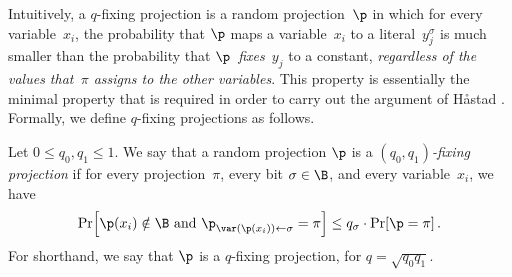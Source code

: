 \documentclass{toc}
\begin{document}
Intuitively, a $q$-fixing projection is a random projection~$\p$
in which for every variable~$x_{i}$, the probability that $\p$
maps a variable~$x_{i}$ to a literal~$y_{j}^{\sigma}$ is much
smaller than the probability that $\p$~\emph{fixes~}$y_{j}$ to
a constant, \emph{regardless of the values that~$\pi$ assigns to
the other variables}. This property is essentially the minimal property
that is required in order to carry out the argument of H{\aa}stad
\cite{H98}. Formally, we define $q$-fixing projections as follows. 
\begin{definition}
\label{def:fixing-projections}Let $0\le q_{0},q_{1}\le1$. We say that
a random projection $\p$ is a \emph{$(q_{0},q_{1})$-fixing projection}
if for every projection~$\pi$, every bit $\sigma\in\B$, and every
variable~$x_{i}$, we have 
\begin{equation}
\Pr\!\left[\p(x_{i})\notin\B\text{ and }\p_{\var(\p(x_{i}))\gets\sigma}=\pi\right]\le q_{\sigma}\cdot\Pr\!\left[\p=\pi\right].\label{eq:fixing-projection}
\end{equation}
For shorthand, we say that $\p$ is a $q$-fixing projection, for
$q=\sqrt{q_{0}q_{1}}$. 
\end{definition}
\end{document}

